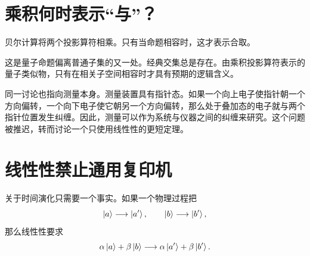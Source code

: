 \begin{classroomqa}
\end{classroomqa}

\section{乘积何时表示“与”？}

贝尔计算将两个投影算符相乘。只有当命题相容时，这才表示合取。

\begin{classroomqa}
\end{classroomqa}

这是量子命题偏离普通子集的又一处。经典交集总是存在。由乘积投影算符表示的量子类似物，只有在相关子空间相容时才具有预期的逻辑含义。

同一讨论也指向测量本身。测量装置具有指针态。如果一个向上电子使指针朝一个方向偏转，一个向下电子使它朝另一个方向偏转，那么处于叠加态的电子就与两个指针位置发生纠缠。因此，测量可以作为系统与仪器之间的纠缠来研究。这个问题被推迟，转而讨论一个只使用线性性的更短定理。

\begin{classroomqa}
\end{classroomqa}

\section{线性性禁止通用复印机}

关于时间演化只需要一个事实。如果一个物理过程把
\begin{equation}
  \left\lvert a\right\rangle\longrightarrow\left\lvert a'\right\rangle,
  \qquad
  \left\lvert b\right\rangle\longrightarrow\left\lvert b'\right\rangle,
\end{equation}
那么线性性要求
\begin{equation}
  \alpha\left\lvert a\right\rangle+\beta\left\lvert b\right\rangle
  \longrightarrow
  \alpha\left\lvert a'\right\rangle+\beta\left\lvert b'\right\rangle.
  \label{eq:l05-linearity}
\end{equation}

